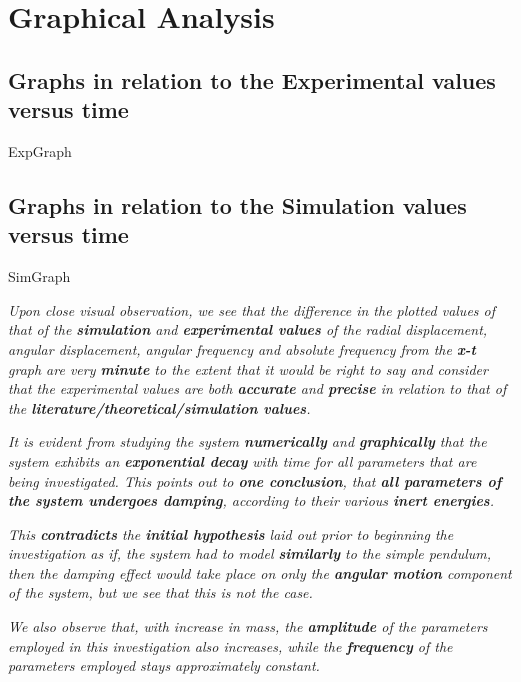 \section{{Graphical Analysis}}
            
    \subsection{{Graphs in relation to the Experimental values versus time}}
            
        {ExpGraph}
            
    \subsection{{Graphs in relation to the Simulation values versus time}}
            
        {SimGraph}
            
            
    \textit{Upon close visual observation, we see that the difference in the plotted values of that of the \textbf{simulation} and \textbf{experimental values} of the radial displacement, angular displacement, angular frequency and absolute frequency from the \textbf{x-t} graph are very \textbf{minute} to the extent that it would be right to say and consider that the experimental values are both \textbf{accurate} and \textbf{precise} in relation to that of the \textbf{literature/theoretical/simulation values}.}
        
	\textit{It is evident from studying the system \textbf{numerically} and \textbf{graphically} that the system exhibits an \textbf{exponential decay} with time for all parameters that are being investigated. This points out to \textbf{one conclusion}, that \textbf{all parameters of the system undergoes damping}, according to their various \textbf{inert energies}.}
	 
	\textit{This \textbf{contradicts} the \textbf{initial hypothesis} laid out prior to beginning the investigation as if, the system had to model \textbf{similarly} to the simple pendulum, then the damping effect would take place on only the \textbf{angular motion} component of the system, but we see that this is not the case.}        
        
    \textit{We also observe that, with increase in mass, the \textbf{amplitude} of the parameters employed in this investigation also increases, while the \textbf{frequency} of the parameters employed stays approximately constant.}
        
    
    


